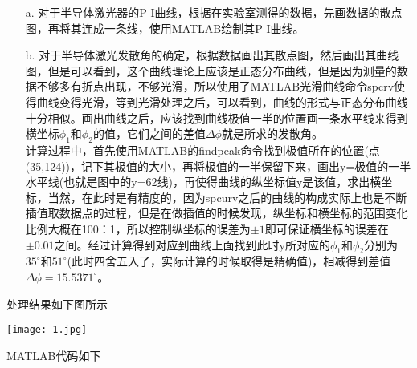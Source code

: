 \documentclass{zjureport}
\begin{document}
\begin{clause}
		\begin{itemize}
			\item[a.] 对于半导体激光器的P-I曲线，根据在实验室测得的数据，先画数据的散点图，再将其连成一条线，使用MATLAB绘制其P-I曲线。
			\item[b.] 对于半导体激光发散角的确定，根据数据画出其散点图，然后画出其曲线图，但是可以看到，这个曲线理论上应该是正态分布曲线，但是因为测量的数据不够多有折点出现，不够光滑，所以使用了MATLAB光滑曲线命令spcrv使得曲线变得光滑，等到光滑处理之后，可以看到，曲线的形式与正态分布曲线十分相似。画出曲线之后，应该找到曲线极值一半的位置画一条水平线来得到横坐标$\phi_{1}$和$\phi_{2}$的值，它们之间的差值$\Delta\phi$就是所求的发散角。\\
			计算过程中，首先使用MATLAB的findpeak命令找到极值所在的位置(点(35,124))，记下其极值的大小，再将极值的一半保留下来，画出y=极值的一半水平线(也就是图中的y=62线)，再使得曲线的纵坐标值y是该值，求出横坐标，当然，在此时是有精度的，因为spcurv之后的曲线的构成实际上也是不断插值取数据点的过程，但是在做插值的时候发现，纵坐标和横坐标的范围变化比例大概在100：1，所以控制纵坐标的误差为$\pm1$即可保证横坐标的误差在$\pm0.01$之间。经过计算得到对应到曲线上面找到此时y所对应的$\phi_{1}$和$\phi_{2}$分别为$35^{\circ}$和$51^{\circ}$(此时四舍五入了，实际计算的时候取得是精确值)，相减得到差值$\Delta\phi=15.5371^{\circ}$。
		\end{itemize}
	
		
	
	\item 处理结果如下图所示
	\begin{center}
				\texttt{[image: 1.jpg]}	
	\end{center}
	\item MATLAB代码如下
	\begin{lstlisting}[language=MATLAB]


\end{lstlisting}
\end{clause}
\end{document}
